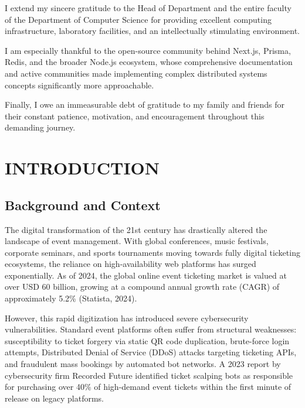 \documentclass[12pt,a4paper]{report}
\begin{document}
I extend my sincere gratitude to the Head of Department and the entire faculty of the Department of Computer Science for providing excellent computing infrastructure, laboratory facilities, and an intellectually stimulating environment.

I am especially thankful to the open-source community behind Next.js, Prisma, Redis, and the broader Node.js ecosystem, whose comprehensive documentation and active communities made implementing complex distributed systems concepts significantly more approachable.

Finally, I owe an immeasurable debt of gratitude to my family and friends for their constant patience, motivation, and encouragement throughout this demanding journey.

\clearpage
\tableofcontents
\clearpage
{}
{}
\listoffigures
\clearpage
{}
{}
\listoftables

\clearpage
{}
\chapter{INTRODUCTION}

\section{Background and Context}
The digital transformation of the 21st century has drastically altered the landscape of event management. With global conferences, music festivals, corporate seminars, and sports tournaments moving towards fully digital ticketing ecosystems, the reliance on high-availability web platforms has surged exponentially. As of 2024, the global online event ticketing market is valued at over USD 60 billion, growing at a compound annual growth rate (CAGR) of approximately 5.2\% (Statista, 2024).

However, this rapid digitization has introduced severe cybersecurity vulnerabilities. Standard event platforms often suffer from structural weaknesses: susceptibility to ticket forgery via static QR code duplication, brute-force login attempts, Distributed Denial of Service (DDoS) attacks targeting ticketing APIs, and fraudulent mass bookings by automated bot networks. A 2023 report by cybersecurity firm Recorded Future identified ticket scalping bots as responsible for purchasing over 40\% of high-demand event tickets within the first minute of release on legacy platforms.
\end{document}
